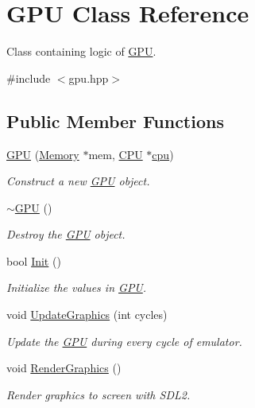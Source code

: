 \hypertarget{classGPU}{}\section{G\+PU Class Reference}
\label{classGPU}


Class containing logic of \mbox{\hyperlink{classGPU}{G\+PU}}.  




{\ttfamily \#include $<$gpu.\+hpp$>$}

\subsection*{Public Member Functions}
\begin{DoxyCompactItemize}
\item 
\mbox{\hyperlink{classGPU_a18e803c48776e14aa5b04d58a35ec4ac}{G\+PU}} (\mbox{\hyperlink{classMemory}{Memory}} $\ast$mem, \mbox{\hyperlink{classCPU}{C\+PU}} $\ast$\mbox{\hyperlink{classGPU_ac0e1560d40298f3ae2548af7bb44e67d}{cpu}})
\begin{DoxyCompactList}\small\item\em Construct a new \mbox{\hyperlink{classGPU}{G\+PU}} object. \end{DoxyCompactList}\item 
\mbox{\label{classGPU_ac4d153a08d3b9f40e5a8f1634f4a9e78}} 
\mbox{\hyperlink{classGPU_ac4d153a08d3b9f40e5a8f1634f4a9e78}{$\sim$\+G\+PU}} ()
\begin{DoxyCompactList}\small\item\em Destroy the \mbox{\hyperlink{classGPU}{G\+PU}} object. \end{DoxyCompactList}\item 
bool \mbox{\hyperlink{classGPU_a712acb0ed0ea3baf05379b26922d43f7}{Init}} ()
\begin{DoxyCompactList}\small\item\em Initialize the values in \mbox{\hyperlink{classGPU}{G\+PU}}. \end{DoxyCompactList}\item 
void \mbox{\hyperlink{classGPU_af0b1df5eb7c5270a81fc12aebb89e641}{Update\+Graphics}} (int cycles)
\begin{DoxyCompactList}\small\item\em Update the \mbox{\hyperlink{classGPU}{G\+PU}} during every cycle of emulator. \end{DoxyCompactList}\item 
\mbox{\label{classGPU_af176f18efc74597769280ecc610daea5}} 
void \mbox{\hyperlink{classGPU_af176f18efc74597769280ecc610daea5}{Render\+Graphics}} ()
\begin{DoxyCompactList}\small\item\em Render graphics to screen with S\+D\+L2. \end{DoxyCompactList}\end{DoxyCompactItemize}
